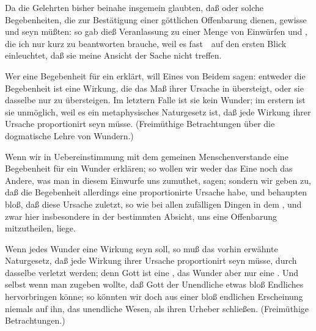 Da die Gelehrten bisher beinahe insgemein glaubten, daß  oder solche Begebenheiten, die zur Bestätigung einer göttlichen Offenbarung dienen, gewisse  und  seyn müßten: so gab dieß Veranlassung zu einer Menge von Einwürfen  und , die ich nur kurz zu beantworten brauche, weil es fast~\ auf den ersten Blick einleuchtet, daß sie meine Ansicht der Sache nicht treffen.\par
{} Wer eine Begebenheit für ein  erklärt, will Eines von Beidem sagen: entweder die Begebenheit ist eine Wirkung, die das Maß ihrer Ursache in  übersteigt, oder sie  dasselbe nur zu übersteigen. Im letztern Falle ist sie kein  Wunder; im erstern ist sie unmöglich, weil es ein metaphysisches Naturgesetz ist, daß jede Wirkung ihrer Ursache proportionirt seyn müsse. (Freimüthige Betrachtungen über die dogmatische Lehre von Wundern.)\par
{} Wenn wir in Uebereinstimmung mit dem gemeinen Menschenverstande eine Begebenheit für ein Wunder erklären; so wollen wir weder das Eine noch das Andere, was man in diesem Einwurfe uns zumuthet, sagen; sondern wir geben zu, daß die Begebenheit allerdings eine proportionirte Ursache habe, und behaupten bloß, daß diese Ursache zuletzt, so wie bei allen zufälligen Dingen in dem , und zwar hier insbesondere in der bestimmten Absicht, uns eine Offenbarung mitzutheilen, liege.\par
{} Wenn jedes Wunder eine Wirkung  seyn soll, so muß das vorhin erwähnte Naturgesetz, daß jede Wirkung ihrer Ursache proportionirt seyn müsse, durch dasselbe verletzt werden; denn Gott ist eine , das Wunder aber nur eine . Und selbst wenn man zugeben wollte, daß Gott der Unendliche etwas bloß Endliches hervorbringen könne; so könnten wir doch aus einer bloß endlichen Erscheinung niemals auf ihn, das unendliche Wesen, als ihren Urheber schließen. (Freimüthige Betrachtungen.)\par

